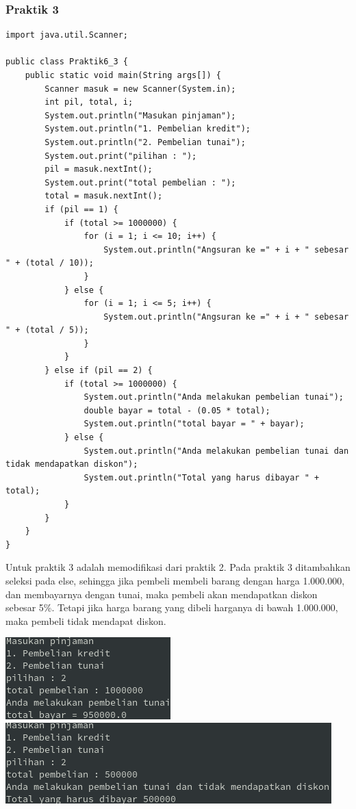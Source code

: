\documentclass[a4paper,12pt]{article}
\begin{document}
\subsubsection{Praktik 3}
\begin{lstlisting}
import java.util.Scanner;

public class Praktik6_3 {
    public static void main(String args[]) {
        Scanner masuk = new Scanner(System.in);
        int pil, total, i;
        System.out.println("Masukan pinjaman");
        System.out.println("1. Pembelian kredit");
        System.out.println("2. Pembelian tunai");
        System.out.print("pilihan : ");
        pil = masuk.nextInt();
        System.out.print("total pembelian : ");
        total = masuk.nextInt();
        if (pil == 1) {
            if (total >= 1000000) {
                for (i = 1; i <= 10; i++) {
                    System.out.println("Angsuran ke =" + i + " sebesar " + (total / 10));
                }
            } else {
                for (i = 1; i <= 5; i++) {
                    System.out.println("Angsuran ke =" + i + " sebesar " + (total / 5));
                }
            }
        } else if (pil == 2) {
            if (total >= 1000000) {
                System.out.println("Anda melakukan pembelian tunai");
                double bayar = total - (0.05 * total);
                System.out.println("total bayar = " + bayar);
            } else {
                System.out.println("Anda melakukan pembelian tunai dan tidak mendapatkan diskon");
                System.out.println("Total yang harus dibayar " + total);
            }
        }
    }
}
\end{lstlisting}
Untuk praktik 3 adalah memodifikasi dari praktik 2. Pada praktik 3 ditambahkan seleksi pada else, sehingga jika pembeli membeli barang dengan harga 1.000.000, dan membayarnya dengan tunai,
maka pembeli akan mendapatkan diskon sebesar 5\%. Tetapi jika harga barang yang dibeli harganya di bawah 1.000.000, maka pembeli tidak mendapat diskon.
\begin{center}
    \includegraphics[scale=.8]{6.png}
    \includegraphics[scale=.8]{7.png}
\end{center}
\end{document}
